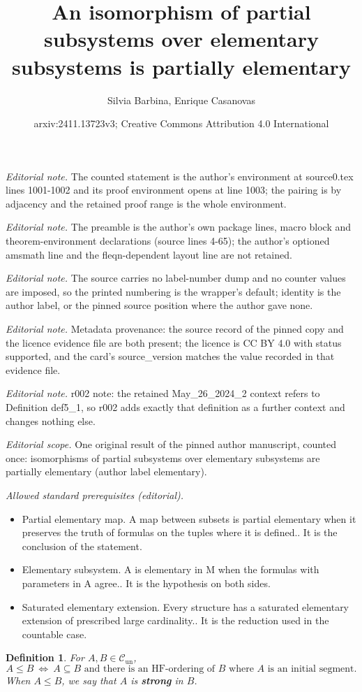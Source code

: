 \documentclass[10pt,a4paper]{article}
\title{An isomorphism of partial subsystems over elementary subsystems is partially elementary}
\author{Silvia Barbina, Enrique Casanovas}
\date{arxiv:2411.13723v3; Creative Commons Attribution 4.0 International}
\newcommand{\Cun}{\mathcal{C}_\mathrm{un}}
\theoremstyle{note}
\newtheorem{df}[thm]{Definition}
\begin{document}
\maketitle
\noindent\textit{Editorial note.} The counted statement is the author's environment at source0.tex lines 1001-1002 and its proof environment opens at line 1003; the pairing is by adjacency and the retained proof range is the whole environment.\par\medskip
\noindent\textit{Editorial note.} The preamble is the author's own package lines, macro block and theorem-environment declarations (source lines 4-65); the author's optioned amsmath line and the fleqn-dependent layout line are not retained.\par\medskip
\noindent\textit{Editorial note.} The source carries no label-number dump and no counter values are imposed, so the printed numbering is the wrapper's default; identity is the author label, or the pinned source position where the author gave none.\par\medskip
\noindent\textit{Editorial note.} Metadata provenance: the source record of the pinned copy and the licence evidence file are both present; the licence is CC BY 4.0 with status supported, and the card's source\_version matches the value recorded in that evidence file.\par\medskip
\noindent\textit{Editorial note.} r002 note: the retained May\_26\_2024\_2 context refers to Definition def5\_1, so r002 adds exactly that definition as a further context and changes nothing else.\par\medskip
\noindent\textit{Editorial scope.} One original result of the pinned author manuscript, counted once: isomorphisms of partial subsystems over elementary subsystems are partially elementary (author label elementary).\par\medskip
\noindent\textit{Allowed standard prerequisites (editorial).}\begin{itemize}
\item Partial elementary map. A map between subsets is partial elementary when it preserves the truth of formulas on the tuples where it is defined.. It is the conclusion of the statement.
\item Elementary subsystem. A is elementary in M when the formulas with parameters in A agree.. It is the hypothesis on both sides.
\item Saturated elementary extension. Every structure has a saturated elementary extension of prescribed large cardinality.. It is the reduction used in the countable case.
\end{itemize}\medskip
	\begin{df} \label{def5_1} For $A, B \in \Cun$,
$$A \leq B \  \Leftrightarrow \ A\subseteq B \mbox{ and there is an HF-ordering of $B$ where $A$ is an initial segment}. $$
When $A \leq B$, we say that $A$ is \textbf{strong} in $B$.
\end{df}
\end{document}
